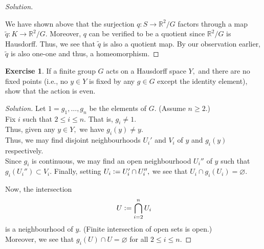 \documentclass[12pt]{article}
\theoremstyle{definition}
\numberwithin{thm}{section}
\newtheorem{exe}[thm]{Exercise}
\let\emptyset\varnothing
\newenvironment{soln}{\begin{proof}[Solution]}{\end{proof}}
\begin{document}
\begin{soln}
\begin{center}
		\end{center}
		We have shown above that the surjection $q:S\to \mathbb{R}^2/G$ factors through a map $\tilde{q}:K \to \mathbb{R}^2/G.$ Moreover, $q$ can be verified to be a quotient since $\mathbb{R}^2/G$ is Hausdorff. Thus, we see that $\tilde{q}$ is also a quotient map. By our observation earlier, $\tilde{q}$ is also one-one and thus, a homeomorphism.
\end{soln}
%
\begin{exe} \label{exe:finitehausdiscontaction}
	If a finite group $G$ acts on a Hausdorff space $Y,$ and there are no fixed points (i.e., no $y \in Y$ is fixed by any $g \in G$ except the identity element), show that the action is even.
\end{exe}
\begin{soln}
	Let $1 = g_1, \ldots, g_n$ be the elements of $G.$ (Assume $n \ge 2.$) \\
	Fix $i$ such that $2 \le i \le n.$ That is, $g_i \neq 1.$\\
	Thus, given any $y \in Y,$ we have $g_i(y) \neq y.$\\
	Thus, we may find disjoint neighbourhoods $U_i'$ and $V_i$ of $y$ and $g_i(y)$ respectively.\\
	Since $g_i$ is continuous, we may find an open neighbourhood $U_i''$ of $y$ such that $g_i(U_i'') \subset V_i.$ Finally, setting $U_i\vcentcolon= U_i'\cap U_i'',$ we see that $U_i \cap g_i(U_i) = \emptyset.$

	Now, the intersection
	\begin{equation*} 
		U \vcentcolon= \bigcap_{i = 2}^n U_i
	\end{equation*}
	is a neighbourhood of $y.$ (Finite intersection of open sets is open.)\\
	Moreover, we see that $g_i(U) \cap U = \emptyset$ for all $2 \le i \le n.$
\end{soln}
\end{document}
